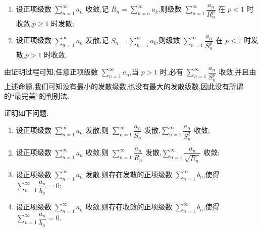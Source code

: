\documentclass[../数学分析培优讲义.tex]{subfiles}
\begin{document}
\begin{proposition}[\markstar]
\begin{enumerate}[label=(\arabic*)]
    \item 设正项级数 $\displaystyle\sum\limits_{n=1}^{\infty}a_n$ 收敛,记 $\displaystyle R_n=\sum\limits_{k=n}^{\infty}a_k$,则级数 $\displaystyle\sum\limits_{n=1}^{\infty}\dfrac{a_n}{R_n^p}$ 在 $p<1$ 时收敛,$p\geq1$ 时发散;
    \item 设正项级数 $\displaystyle\sum\limits_{n=1}^{\infty}a_n$ 发散,记 $\displaystyle S_n=\sum\limits_{k=1}^na_k$,则级数 $\displaystyle\sum\limits_{n=1}^{\infty}\dfrac{a_n}{S_n^p}$ 在 $p\leq1$ 时发散,$p>1$ 时收敛.
\end{enumerate}
\end{proposition}

\begin{remark}
由证明过程可知,任意正项级数 $\displaystyle\sum\limits_{n=1}^{\infty}a_n$,当 $p>1$ 时,必有 $\displaystyle\sum\limits_{n=1}^{\infty}\dfrac{a_n}{S_n^p}$ 收敛.并且由上述命题,我们可知没有最小的发散级数,也没有最大的发散级数,因此没有所谓的``最完美''的判别法.
\end{remark}

\begin{example}[\markstar]
证明如下问题:
\begin{enumerate}[label=(\arabic*)]
    \item 设正项级数 $\displaystyle\sum\limits_{n=1}^{\infty}a_n$ 发散,则 $\displaystyle\sum\limits_{n=1}^{\infty}\dfrac{a_n}{S_n}$ 发散,$\displaystyle\sum\limits_{n=1}^{\infty}\dfrac{a_n}{S_n^2}$ 收敛;
    \item 设正项级数 $\displaystyle\sum\limits_{n=1}^{\infty}a_n$ 收敛,则 $\displaystyle\sum\limits_{n=1}^{\infty}\dfrac{a_n}{R_n}$ 发散,$\displaystyle\sum\limits_{n=1}^{\infty}\dfrac{a_n}{\sqrt{R_n}}$ 收敛;
    \item 设正项级数 $\displaystyle\sum\limits_{n=1}^{\infty}a_n$ 发散,则存在发散的正项级数 $\displaystyle\sum\limits_{n=1}^{\infty}b_n$,使得 $\displaystyle\sum\limits_{n=1}^{\infty}\dfrac{a_n}{b_n}=0$;
    \item 设正项级数 $\displaystyle\sum\limits_{n=1}^{\infty}a_n$ 收敛,则存在收敛的正项级数 $\displaystyle\sum\limits_{n=1}^{\infty}b_n$,使得 $\displaystyle\sum\limits_{n=1}^{\infty}\dfrac{a_n}{b_n}=0$.
\end{enumerate}
\end{example}
\exampleblank
\end{document}
